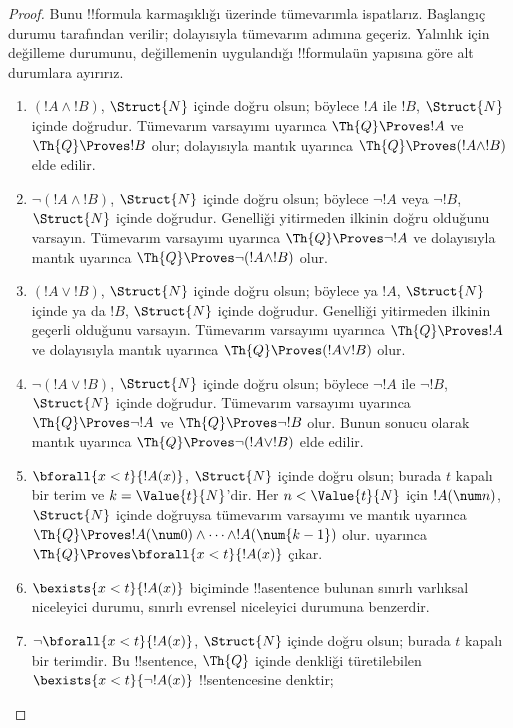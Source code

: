 \begin{proof}
Bunu !!{formula} karmaşıklığı üzerinde tümevarımla ispatlarız.
%
Başlangıç durumu  tarafından verilir;
dolayısıyla tümevarım adımına geçeriz. Yalınlık için değilleme durumunu,
değillemenin uygulandığı !!{formula}{}ün yapısına göre alt durumlara ayırırız.

\begin{enumerate}
\item $(!A\land !B)$, $\Struct{N}$ içinde doğru olsun; böylece $!A$ ile
$!B$, $\Struct{N}$ içinde doğrudur. Tümevarım varsayımı uyarınca
$\Th{Q} \Proves !A$ ve $\Th{Q} \Proves !B$ olur; dolayısıyla mantık
uyarınca $\Th{Q} \Proves (!A\land !B)$ elde edilir.
%
\item $\lnot(!A\land !B)$, $\Struct{N}$ içinde doğru olsun; böylece
$\lnot !A$ veya $\lnot !B$, $\Struct{N}$ içinde doğrudur. Genelliği
yitirmeden ilkinin doğru olduğunu varsayın. Tümevarım varsayımı uyarınca
$\Th{Q} \Proves \lnot !A$ ve dolayısıyla mantık uyarınca
$\Th{Q} \Proves \lnot(!A\land !B)$ olur.
%
\item $(!A\lor !B)$, $\Struct{N}$ içinde doğru olsun; böylece ya $!A$,
$\Struct{N}$ içinde ya da $!B$, $\Struct{N}$ içinde doğrudur. Genelliği yitirmeden ilkinin geçerli
olduğunu varsayın. Tümevarım varsayımı uyarınca $\Th{Q} \Proves !A$ ve
dolayısıyla mantık uyarınca $\Th{Q} \Proves (!A\lor !B)$ olur.
%
\item $\lnot(!A\lor !B)$, $\Struct{N}$ içinde doğru olsun; böylece
$\lnot !A$ ile $\lnot !B$, $\Struct{N}$ içinde doğrudur. Tümevarım
varsayımı uyarınca $\Th{Q} \Proves \lnot !A$ ve
$\Th{Q} \Proves \lnot !B$ olur. Bunun sonucu olarak mantık uyarınca
$\Th{Q} \Proves \lnot(!A\lor !B)$ elde edilir.
%
\item $\bforall{x<t}{!A(x)}$, $\Struct{N}$ içinde doğru olsun; burada $t$
kapalı bir terim ve $k=\Value{t}{N}$'dir. Her $n<\Value{t}{N}$ için
$!A(\num n)$, $\Struct{N}$ içinde doğruysa tümevarım varsayımı ve mantık
uyarınca $\Th{Q} \Proves !A(\num 0)\land\dots\land !A(\num{k-1})$ olur.
 uyarınca
$\Th{Q} \Proves \bforall{x<t}{!A(x)}$ çıkar.
%
\item $\bexists{x<t}{!A(x)}$ biçiminde !!a{sentence} bulunan sınırlı
varlıksal niceleyici durumu, sınırlı evrensel niceleyici durumuna benzerdir.
%
\item $\lnot\bforall{x<t}{!A(x)}$, $\Struct{N}$ içinde doğru olsun; burada
$t$ kapalı bir terimdir. Bu !!{sentence}, $\Th{Q}$ içinde denkliği
türetilebilen $\bexists{x<t}{\lnot !A(x)}$ !!{sentence}{}sine denktir;

\end{enumerate}
\end{proof}
